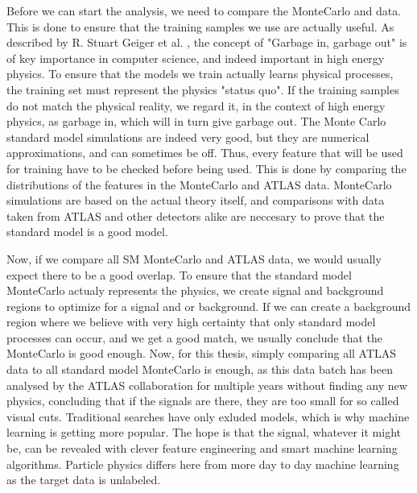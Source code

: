 Before we can start the analysis, we need to compare the MonteCarlo and data. This is done to ensure that the training samples we 
use are actually useful. As described by R. Stuart Geiger et al. \cite{DBLP:journals/corr/abs-2107-02278}, the concept of "Garbage 
in, garbage out" is of key importance in computer science, and indeed important in high energy physics. To ensure that the models 
we train actually learns physical processes, the training set must represent the physics "status quo". If the training samples do 
not match the physical reality, we regard it, in the context of high energy physics, as garbage in, which will in turn give 
garbage out. The Monte Carlo standard model simulations are indeed very good, but they are numerical approximations, and can 
sometimes be off. Thus, every feature that will be used for training have to be checked before being used. This is done by 
comparing the distributions of the features in the MonteCarlo and ATLAS data. MonteCarlo simulations are based on the actual theory 
itself, and comparisons with data taken from ATLAS and other detectors alike are neccesary to prove that the standard model is a good model.

Now, if we compare all SM MonteCarlo and ATLAS data, we would usually expect there to be a good overlap. To ensure that the standard model 
MonteCarlo actualy represents the physics, we create signal and background regions to optimize for a signal and or background. If we can 
create a background region where we believe with very high certainty that only standard model processes can occur, and we get a good match, 
we usually conclude that the MonteCarlo is good enough. Now, for this thesis, simply comparing all ATLAS data to all standard model MonteCarlo
is enough, as this data batch has been analysed by the ATLAS collaboration for multiple years without finding any new physics, concluding 
that if the signals are there, they are too small for so called visual cuts. Traditional searches have only exluded models, which is why 
machine learning is getting more popular. The hope is that the signal, whatever it might be, can be revealed with clever feature 
engineering and smart machine learning algorithms. Particle physics differs here from more day to day machine learning as the target data is 
unlabeled. 


